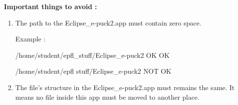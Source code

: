 \documentclass[a4paper]{article}
\begin{document}
\textbf{Important things to avoid :}

\begin{enumerate}
\item The path to the Eclipse\_e-puck2.app must contain zero space. 

Example :

/home/student/epfl\_stuff/Eclipse\_e-puck2 OK   OK

/home/student/epfl stuff/Eclipse\_e-puck2 NOT OK

\item The file's structure in the Eclipse\_e-puck2.app must remains the same. It means no file inside this app must be moved to another place.
\end{enumerate}
\end{document}
